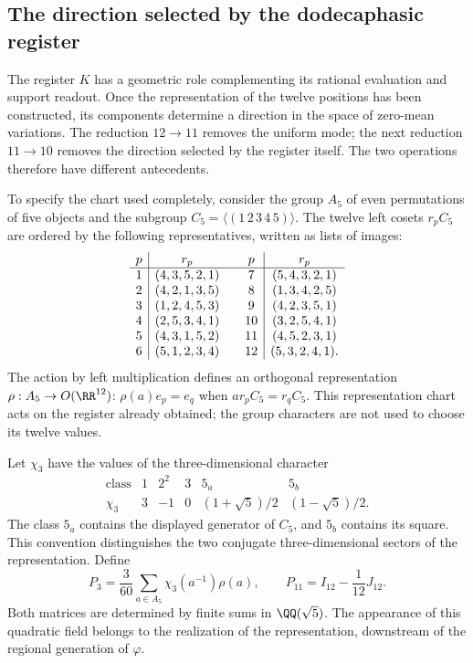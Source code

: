 \subsection{The direction selected by the dodecaphasic register}
\label{exc:k-direccion}

The register \(K\) has a geometric role complementing its
rational evaluation and support readout. Once the representation of
the twelve positions has been constructed, its components determine a
direction in the space of zero-mean variations. The reduction
\(12\to11\) removes the uniform mode; the next reduction
\(11\to10\) removes the direction selected by the register itself.
The two operations therefore have different antecedents.

To specify the chart used completely, consider the group
\(A_5\) of even permutations of five objects and the subgroup
\(C_5=\langle(1\,2\,3\,4\,5)\rangle\). The twelve left cosets
\(r_pC_5\) are ordered by the following representatives, written as
lists of images:
\[
\begin{array}{c|c@{\qquad}c|c}
p&r_p&p&r_p\\ \hline
1&(4,3,5,2,1)&7&(5,4,3,2,1)\\
2&(4,2,1,3,5)&8&(1,3,4,2,5)\\
3&(1,2,4,5,3)&9&(4,2,3,5,1)\\
4&(2,5,3,4,1)&10&(3,2,5,4,1)\\
5&(4,3,1,5,2)&11&(4,5,2,3,1)\\
6&(5,1,2,3,4)&12&(5,3,2,4,1).
\end{array}
\]
The action by left multiplication defines an orthogonal
representation \(\rho:A_5\to O(\RR^{12})\):
\(\rho(a)e_p=e_q\) when \(ar_pC_5=r_qC_5\).
This representation chart acts on the register already obtained;
the group characters are not used to choose its twelve values.

Let \(\chi_3\) have the values of the three-dimensional character
\[
\begin{array}{c|ccccc}
\text{class}&1&2^2&3&5_a&5_b\\ \hline
\chi_3&3&-1&0&(1+\sqrt5)/2&(1-\sqrt5)/2.
\end{array}
\]
The class \(5_a\) contains the displayed generator of \(C_5\), and
\(5_b\) contains its square. This convention distinguishes the two
conjugate three-dimensional sectors of the representation. Define
\begin{equation}
 P_3=\frac3{60}\sum_{a\in A_5}\chi_3(a^{-1})\rho(a),
 \qquad P_{11}=I_{12}-\frac1{12}J_{12}.
 \label{eq:k-proyectores-incidencia}
\end{equation}
Both matrices are determined by finite sums in
\(\QQ(\sqrt5)\). The appearance of this quadratic field belongs
to the realization of the representation, downstream of the regional
generation of \(\varphi\).


